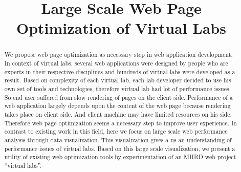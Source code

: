 \documentclass[conference]{IEEEtran}
\title{Large Scale Web Page Optimization of Virtual Labs}
\begin{document}
\maketitle

\begin{abstract}
We propose web page optimization as necessary step in web application
development. In context of virtual labs, several web applications were designed by people who are 
experts in their respective disciplines and hundreds of virtual labs were developed as a result.
Based on complexity of each virtual lab, each lab developer decided to use his own 
set of tools and technologies, therefore virtual lab had lot of performance issues.
So end user suffered from slow rendering of pages on the client side.
Performance of a web application largely depends upon the content of the web
page because rendering takes place on client side. 
And client machine may have limited resources on his side. Therefore web page
optimization seems a necessary step to improve user experience.
In contrast to existing work in this field, here we focus on large scale web
performance analysis through data visualization. This visualization gives a
us an understanding of performance issues of virtual labs. Based on this large scale visualization,
we present a utility of existing web optimization tools by experimentation of an
MHRD web project ``virtual labs''.
\end{abstract}
\end{document}
